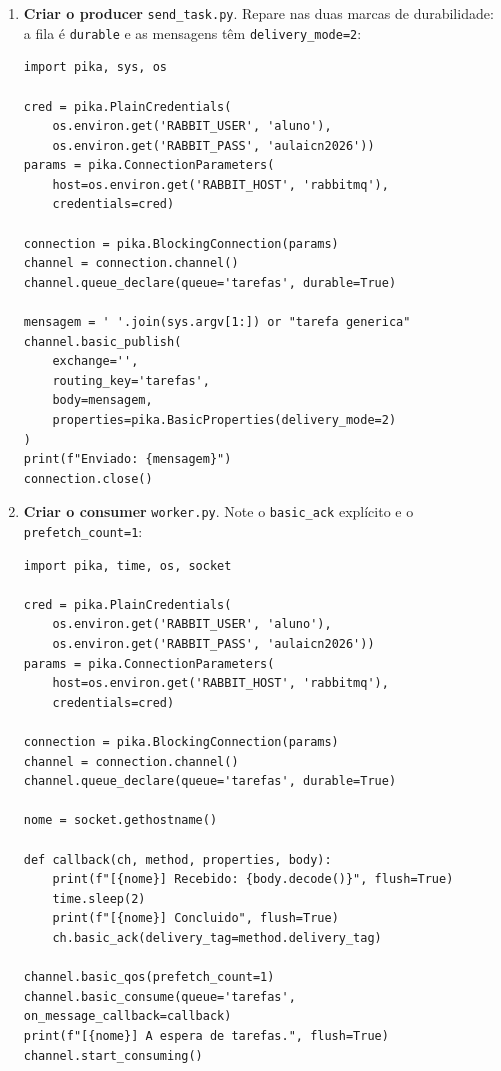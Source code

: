 \documentclass[11pt,a4paper]{article}
\begin{document}
\begin{enumerate}[label=\arabic*.,resume]

  \item \textbf{Criar o producer} \texttt{send\_task.py}. Repare nas duas marcas de durabilidade: a fila é \texttt{durable} e as mensagens têm \texttt{delivery\_mode=2}:
\begin{lstlisting}
import pika, sys, os

cred = pika.PlainCredentials(
    os.environ.get('RABBIT_USER', 'aluno'),
    os.environ.get('RABBIT_PASS', 'aulaicn2026'))
params = pika.ConnectionParameters(
    host=os.environ.get('RABBIT_HOST', 'rabbitmq'),
    credentials=cred)

connection = pika.BlockingConnection(params)
channel = connection.channel()
channel.queue_declare(queue='tarefas', durable=True)

mensagem = ' '.join(sys.argv[1:]) or "tarefa generica"
channel.basic_publish(
    exchange='',
    routing_key='tarefas',
    body=mensagem,
    properties=pika.BasicProperties(delivery_mode=2)
)
print(f"Enviado: {mensagem}")
connection.close()
\end{lstlisting}

  \item \textbf{Criar o consumer} \texttt{worker.py}. Note o \texttt{basic\_ack} explícito e o \texttt{prefetch\_count=1}:
\begin{lstlisting}
import pika, time, os, socket

cred = pika.PlainCredentials(
    os.environ.get('RABBIT_USER', 'aluno'),
    os.environ.get('RABBIT_PASS', 'aulaicn2026'))
params = pika.ConnectionParameters(
    host=os.environ.get('RABBIT_HOST', 'rabbitmq'),
    credentials=cred)

connection = pika.BlockingConnection(params)
channel = connection.channel()
channel.queue_declare(queue='tarefas', durable=True)

nome = socket.gethostname()

def callback(ch, method, properties, body):
    print(f"[{nome}] Recebido: {body.decode()}", flush=True)
    time.sleep(2)
    print(f"[{nome}] Concluido", flush=True)
    ch.basic_ack(delivery_tag=method.delivery_tag)

channel.basic_qos(prefetch_count=1)
channel.basic_consume(queue='tarefas', on_message_callback=callback)
print(f"[{nome}] A espera de tarefas.", flush=True)
channel.start_consuming()
\end{lstlisting}


\end{enumerate}
\end{document}
